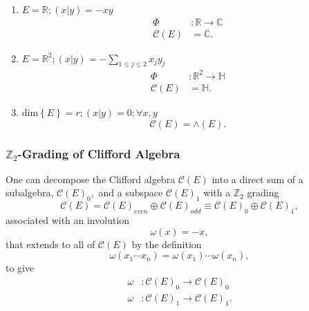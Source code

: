\documentclass[aps,preprint]{revtex4}%
\begin{document}
\begin{enumerate}
\item $E=\mathbb{R};\left(  \left.  x\right\vert y\right)  =-xy$%
\begin{align}
\Phi &  :\mathbb{R}\rightarrow\mathbb{C}\\
\mathcal{C}\left(  E\right)   &  =\mathbb{C}.
\end{align}


\item $E=\mathbb{R}^{2};\left(  \left.  x\right\vert y\right)  =-\sum
\limits_{1\leq j\leq2}x_{j}y_{j}$%
\begin{align}
\Phi &  :\mathbb{R}^{2}\rightarrow\mathbb{H}\\
\mathcal{C}\left(  E\right)   &  =\mathbb{H}.
\end{align}


\item dim$\left\{  E\right\}  =r;\left(  \left.  x\right\vert y\right)
=0;\forall x,y$%
\begin{equation}
\mathcal{C}\left(  E\right)  =\wedge\left(  E\right)  .
\end{equation}

\end{enumerate}

\subsubsection{$\mathbb{Z}_{2}$-Grading of Clifford Algebra}

One can decompose the Clifford algebra $\mathcal{C}\left(  E\right)  $ into a
direct sum of a subalgebra, $\mathcal{C}\left(  E\right)  _{0},$ and a
subspace $\mathcal{C}\left(  E\right)  _{1}$ with a $\mathbb{Z}_{2}$ grading
\begin{equation}
\mathcal{C}\left(  E\right)  =\mathcal{C}\left(  E\right)  _{even}%
\oplus\mathcal{C}\left(  E\right)  _{odd}\equiv\mathcal{C}\left(  E\right)
_{0}\oplus\mathcal{C}\left(  E\right)  _{1},
\end{equation}
associated with an involution
\begin{equation}
\omega\left(  x\right)  =-x,
\end{equation}
that extends to all of $\mathcal{C}\left(  E\right)  $ by the definition
\begin{equation}
\omega\left(  x_{1}\cdots x_{n}\right)  =\omega\left(  x_{1}\right)
\cdots\omega\left(  x_{n}\right)  ,
\end{equation}
to give
\begin{align}
\omega &  :\mathcal{C}\left(  E\right)  _{0}\rightarrow\mathcal{C}\left(
E\right)  _{0}\\
\omega &  :\mathcal{C}\left(  E\right)  _{1}\rightarrow\mathcal{C}\left(
E\right)  _{1}.
\end{align}
\end{document}
